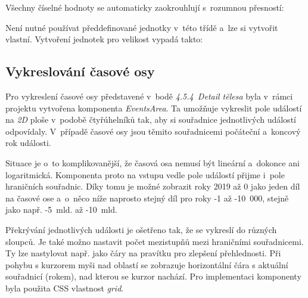 \documentclass[a4paper,12pt]{article}
\begin{document}


Všechny číselné hodnoty se automaticky zaokrouhlují s~rozumnou přesností:



Není nutné používat předdefinované jednotky v~této třídě a~lze si vytvořit vlastní. Vytvoření jednotek pro velikost vypadá takto:



\subsection{Vykreslování časové osy}

Pro vykreslení časové osy představené v~bodě \textit{4.5.4~Detail tělesa} byla v~rámci projektu vytvořena komponenta \textit{EventsArea}. Ta umožňuje vykreslit pole událostí na \textit{2D} ploše v~podobě čtyřúhelníků tak, aby si souřadnice jednotlivých událostí odpovídaly. V~případě časové osy jsou těmito souřadnicemi počáteční a~koncový rok události.

Situace je o~to komplikovanější, že časová osa nemusí být lineární a~dokonce ani logaritmická. Komponenta proto na vstupu vedle pole událostí přijme i~pole hraničních souřadnic. Díky tomu je možné zobrazit roky 2019 až 0 jako jeden díl na časové ose a~o~něco níže naprosto stejný díl pro roky -1 až -10~000, stejně jako např. -5~mld. až -10~mld.

Překrývání jednotlivých události je ošetřeno tak, že se vykreslí do různých sloupců. Je také možno nastavit počet mezistupňů mezi hraničními souřadnicemi. Ty lze nastylovat např. jako čáry na pravítku pro zlepšení přehlednosti. Při pohybu s kurzorem myši nad oblastí se zobrazuje horizontální čára s aktuální souřadnicí (rokem), nad kterou se kurzor nachází. Pro implementaci komponenty byla použita CSS vlastnost \textit{grid}.





\clearpage {} {}
\end{document}
